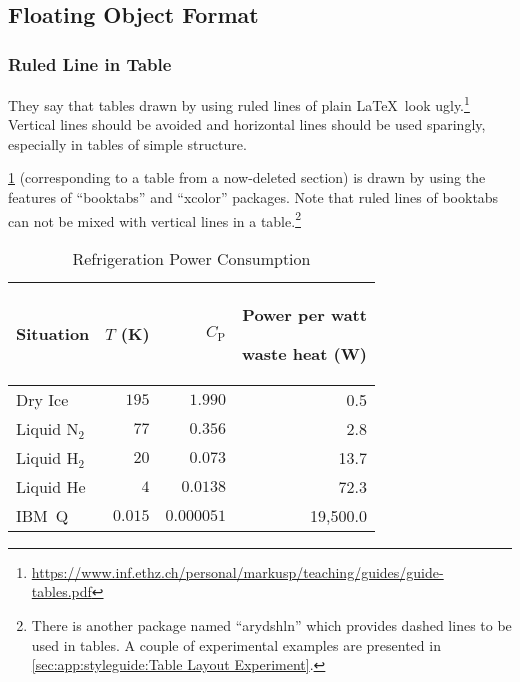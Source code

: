 \subsection{Floating Object Format}
\label{sec:app:styleguide:Floating Object Format}

\subsubsection{Ruled Line in Table}
\label{sec:app:styleguide:Ruled Line in Table}

They say that tables drawn by using ruled lines of plain \LaTeX\
look ugly.\footnote{
  \url{https://www.inf.ethz.ch/personal/markusp/teaching/guides/guide-tables.pdf}
}
Vertical lines should be avoided and horizontal lines should be
used sparingly, especially in tables of simple structure.


\newcommand{\TLo}{T_\mathrm{L}}
\newcommand{\THi}{T_\mathrm{H}}
\newcommand{\CPf}{C_\mathrm{P}}

\cref{tab:app:styleguide:Refrigeration Power Consumption}
(corresponding to a table from a now-deleted section)
is drawn by using the features of ``booktabs'' and ``xcolor'' packages.
Note that ruled lines of booktabs can not be mixed with
vertical lines in a table.\footnote{
  There is another package named ``arydshln'' which provides dashed lines
  to be used in tables. A couple of experimental examples are presented in
  \cref{sec:app:styleguide:Table Layout Experiment}.
}

\begin{table}[tbhp]
\renewcommand*{\arraystretch}{1.2}\centering\small
\begin{tabular}{lrrr}\toprule
Situation
	& $T$ (K)
		& $\CPf$ & \parbox[b]{.75in}{\raggedleft Power per watt\par waste heat (W)} \\
\midrule
Dry Ice
	& $195$
		& $1.990$
			& 0.5 \\
Liquid N$_2$
	& $77$
		& $0.356$
			& 2.8 \\
Liquid H$_2$
	& $20$
		& $0.073$
			& 13.7 \\
Liquid He
	& $4$
		& $0.0138$
			& 72.3 \\
IBM~Q	& $0.015$
		& $0.000051$
			& 19,500.0 \\
\bottomrule
\end{tabular}
\caption{Refrigeration Power Consumption}
\label{tab:app:styleguide:Refrigeration Power Consumption}
\end{table}

